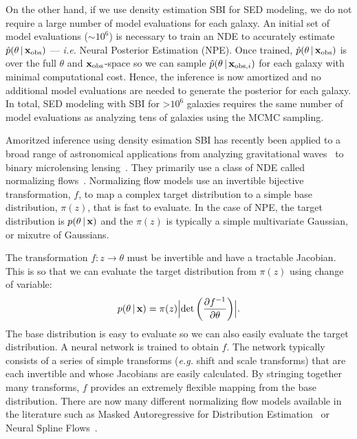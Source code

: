 On the other hand, if we use density estimation SBI for SED modeling, we do not
require a large number of model evaluations for each galaxy. 
An initial set of model evaluations (${\sim}10^6$) is necessary to train an NDE
to accurately estimate $\hat{p}(\theta \,|\, {\bf x}_{\rm obs})$ --- \emph{i.e.} Neural
Posterior Estimation (NPE).
Once trained, $\hat{p}(\theta \,|\, {\bf x}_{\rm obs})$ is over the full $\theta$ and
${\bf x}_{\rm obs}$-space so we can sample $\hat{p}(\theta \,|\, {\bf x}_{{\rm obs}, i})$
for each galaxy with minimal computational cost. 
Hence, the inference is now amortized and no additional model evaluations are
needed to generate the posterior for each galaxy. 
In total, SED modeling with SBI for >$10^6$ galaxies requires the same number
of model evaluations as analyzing tens of galaxies using the MCMC sampling. 

Amoritzed inference using density esimation SBI has recently been applied to a
broad range of astronomical applications from analyzing gravitational
waves~\citep[\emph{e.g.}][]{wong2020,dax2021} to binary microlensing
lensing~\citep{zhang2021}.
They primarily use a class of NDE called normalizing flows~\citep{tabak2010,
tabak2013}.
Normalizing flow models use an invertible bijective transformation, $f$, to map
a complex target distribution to a simple base distribution, $\pi(z)$, that is
fast to evaluate.
In the case of NPE, the target distribution is $p(\theta \,|\, {\bf x})$ and
the $\pi(z)$ is typically a simple multivariate Gaussian, or mixutre of
Gaussians. 

The transformation $f: z \rightarrow \theta$ must be invertible and have a
tractable Jacobian. 
This is so that we can evaluate the target distribution from $\pi(z)$ using
change of variable:  
\begin{equation}
    p(\theta \given {\bf x}) = \pi(z) \Bigl|{\rm det} \left(\frac{\partial
    f^{-1}}{\partial \theta} \right)\Bigr|.
\end{equation} 
The base distribution is easy to evaluate so we can also easily evaluate the
target distribution.  
A neural network is trained to obtain $f$.
The network typically consists of a series of simple transforms (\emph{e.g.}
shift and scale transforms) that are each invertible and whose Jacobians are
easily calculated. 
By stringing together many transforms, $f$ provides an extremely flexible
mapping from the base distribution.
There are now many different normalizing flow models available in the
literature such as Masked Autoregressive for Distribution
Estimation~\citep[MADE;][]{germain2015} or Neural Spline
Flows~\citep{durkan2019}. 

